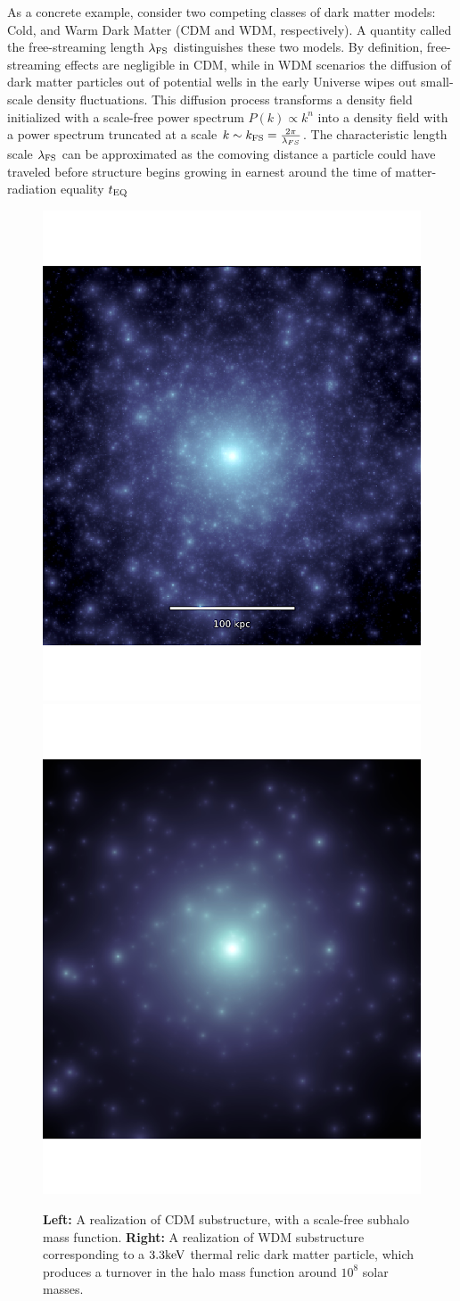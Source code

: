 As a concrete example, consider two competing classes of dark matter models: Cold, and Warm Dark Matter (CDM and WDM, respectively). A quantity called the free-streaming length $\lambda_{\rm{FS}}$ distinguishes these two models. By definition, free-streaming effects are negligible in CDM, while in WDM scenarios the diffusion of dark matter particles out of potential wells in the early Universe wipes out small-scale density fluctuations. This diffusion process transforms a density field initialized with a scale-free power spectrum $P\left(k\right) \propto k^{n}$ into a density field with a power spectrum truncated at a scale $k \sim k_{\rm{FS}} = \frac{2 \pi}{\lambda_{FS}}$. The characteristic length scale $\lambda_{\rm{FS}}$ can be approximated as the comoving distance a particle could have traveled before structure begins growing in earnest around the time of matter-radiation equality $t_{\rm{EQ}}$ \cite{Schneider++12} 
\begin{figure}
	\centering
	\includegraphics[clip,trim=0cm 0cm 0cm
	0cm,width=.49\textwidth,keepaspectratio]{./figures_introduction/CDMscreenshot_edited.pdf}
	\includegraphics[clip,trim=0cm 0cm 0cm
	0cm,width=.49\textwidth,keepaspectratio]{./figures_introduction/WDMrealization_nobar.pdf}
	\caption[CDM and WDM subhalo populations]{\label{fig:wdmrealization} {\bf{Left:}} A realization of CDM substructure, with a scale-free subhalo mass function. {\bf{Right:}} A realization of WDM substructure corresponding to a $3.3 \rm{keV}$ thermal relic dark matter particle, which produces a turnover in the halo mass function around $10^8$ solar masses. }
\end{figure}

